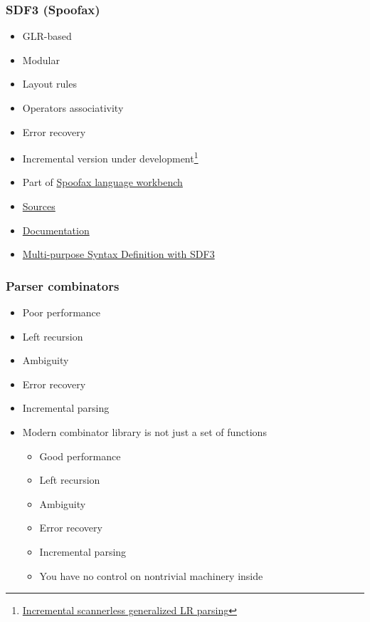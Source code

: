 \documentclass[xcolor=table,aspectratio=169]{beamer}
\begin{document}
\begin{frame}[fragile]
  \frametitle{SDF3 (Spoofax)}
  \begin{itemize}
    \item GLR-based
    \item[\faPlus] Modular
    \item[\faPlus] Layout rules
    \item[\faPlus] Operators associativity
    \item[\faMinus\faQuestion] Error recovery
    \item Incremental version under development\footnote{\href{https://dl.acm.org/doi/abs/10.1145/3359061.3361085}{Incremental scannerless generalized LR parsing}}
  \end{itemize}  
  \pause
  \begin{itemize}
    \item Part of \href{https://www.spoofax.dev/}{Spoofax language workbench}
    \item \href{https://github.com/metaborg/sdf}{Sources}
    \item \href{https://www.spoofax.dev/references/syntax/}{Documentation}
    \item \href{https://link.springer.com/chapter/10.1007/978-3-030-58768-0_1}{Multi-purpose Syntax Definition with SDF3}
  \end{itemize}  
  
\end{frame}


\begin{frame}[fragile]
  \frametitle{Parser combinators}  
  \begin{itemize}
    \item[\faThumbsODown] Poor performance 
    \item[\faTimes] Left recursion
    \item[\faTimes] Ambiguity 
    \item[\faTimes] Error recovery
    \item[\faTimes] Incremental parsing  
    \pause
    \item[\faLightbulbO] Modern combinator library is not just a set of functions
    \begin{itemize}
      \item[\faThumbsOUp] Good performance
      \item[\faPlus] Left recursion 
      \item[\faPlus] Ambiguity
      \pause
      \item[\faQuestion] Error recovery
      \item[\faQuestion] Incremental parsing
      \pause
      \item[\faThumbsODown] You have no control on nontrivial machinery inside
    \end{itemize}
  \end{itemize}
\end{frame}
\end{document}
